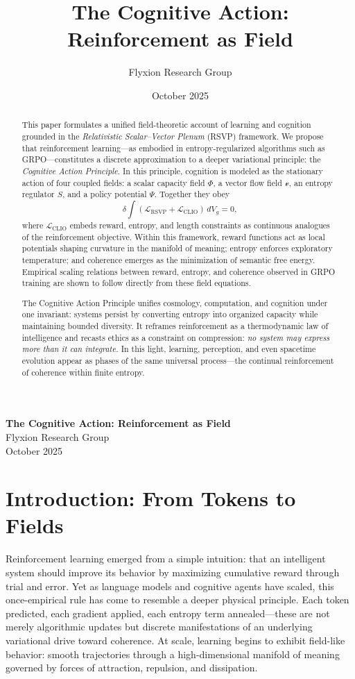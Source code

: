\documentclass[11pt]{article}
\title{The Cognitive Action: Reinforcement as Field}
\author{Flyxion Research Group}
\date{October 2025}
\begin{document}
\begin{titlepage}
\centering
{\Large \textbf{The Cognitive Action: Reinforcement as Field}}\\[0.5cm]
{\large Flyxion Research Group}\\[0.25cm]
{\normalsize October 2025}\\[1cm]

\begin{abstract}
\noindent
This paper formulates a unified field-theoretic account of learning and cognition grounded in the
\textit{Relativistic Scalar–Vector Plenum} (RSVP) framework.  
We propose that reinforcement learning---as embodied in entropy-regularized algorithms such as GRPO---constitutes a discrete approximation to a deeper variational principle: 
the \emph{Cognitive Action Principle}.  
In this principle, cognition is modeled as the stationary action of four coupled fields:
a scalar capacity field $\Phi$, a vector flow field $\mathcal{v}$, an entropy regulator $S$, and a policy potential $\Psi$.
Together they obey
\[
\delta\!\int\!(\mathcal{L}_{\mathrm{RSVP}}+\mathcal{L}_{\mathrm{CLIO}})\,dV_g = 0,
\]
where $\mathcal{L}_{\mathrm{CLIO}}$ embeds reward, entropy, and length constraints as continuous analogues of the reinforcement objective.
Within this framework, reward functions act as local potentials shaping curvature in the manifold of meaning; 
entropy enforces exploratory temperature; 
and coherence emerges as the minimization of semantic free energy.  
Empirical scaling relations between reward, entropy, and coherence observed in GRPO training are shown to follow directly from these field equations.

The Cognitive Action Principle unifies cosmology, computation, and cognition under one invariant:
systems persist by converting entropy into organized capacity while maintaining bounded diversity.  
It reframes reinforcement as a thermodynamic law of intelligence and recasts ethics as a constraint on compression:
\emph{no system may express more than it can integrate.}  
In this light, learning, perception, and even spacetime evolution appear as phases of the same universal process---the continual reinforcement of coherence within finite entropy.
\end{abstract}
\vfill
\end{titlepage}

\section{Introduction: From Tokens to Fields}
Reinforcement learning emerged from a simple intuition: that an intelligent system should improve its behavior by maximizing cumulative reward through trial and error. 
Yet as language models and cognitive agents have scaled, this once-empirical rule has come to resemble a deeper physical principle. 
Each token predicted, each gradient applied, each entropy term annealed—these are not merely algorithmic updates but discrete manifestations of an underlying variational drive toward coherence. 
At scale, learning begins to exhibit field-like behavior: smooth trajectories through a high-dimensional manifold of meaning governed by forces of attraction, repulsion, and dissipation. 
\end{document}
